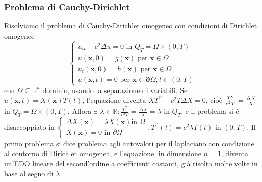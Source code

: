 \documentclass{article}
\begin{document}
\subsubsection{Problema di Cauchy-Dirichlet}

Risolviamo il problema di Cauchy-Dirichlet omogeneo con condizioni di
Dirichlet omogenee 
\begin{equation*}
\left\{ 
\begin{array}{c}
u_{tt}-c^{2}\Delta u=0\text{ in }Q_{T}=\Omega \times \left( 0,T\right) \\ 
u\left( \mathbf{x},0\right) =g\left( \mathbf{x}\right) \text{ per }\mathbf{x}%
\in \Omega \\ 
u_{t}\left( \mathbf{x},0\right) =h\left( \mathbf{x}\right) \text{ per }%
\mathbf{x}\in \Omega \\ 
u\left( \mathbf{x},t\right) =0\text{ per }\mathbf{x\in \partial }\Omega
,t\in \left( 0,T\right)%
\end{array}%
\right. 
\end{equation*}
con $\Omega \subseteq 
\mathbb{R}
^{n}$ dominio, usando la separazione di variabili. Se $u\left( \mathbf{x}%
,t\right) =X\left( \mathbf{x}\right) T\left( t\right) $, l'equazione diventa 
$XT^{\prime \prime }-c^{2}T\Delta X=0$, cio\`{e} $\frac{T^{\prime \prime }}{%
c^{2}T}=\frac{\Delta X}{X}$ in $Q_{T}=\Omega \times \left( 0,T\right) $.
Allora $\exists $ $\lambda \in 
\mathbb{R}
:\frac{T^{\prime \prime }}{c^{2}T}=\frac{\Delta X}{X}=\lambda $ in $Q_{T}$,
e il problema si \`{e} disaccoppiato in $\left\{ 
\begin{array}{c}
\Delta X\left( \mathbf{x}\right) =\lambda X\left( \mathbf{x}\right) \text{
in }\Omega \\ 
X\left( \mathbf{x}\right) =0\text{ in }\partial \Omega%
\end{array}%
\right. ,T^{\prime \prime }\left( t\right) =c^{2}\lambda T\left( t\right) $
in $\left( 0,T\right) $. Il primo problema si dice problema agli autovalori
per il laplaciano con condizione al contorno di Dirichlet omogenea, e
l'equazione, in dimensione $n=1$, diventa un'EDO lineare del second'ordine a
coefficienti costanti, gi\`{a} risolta molte volte in base al segno di $%
\lambda $.
\end{document}
